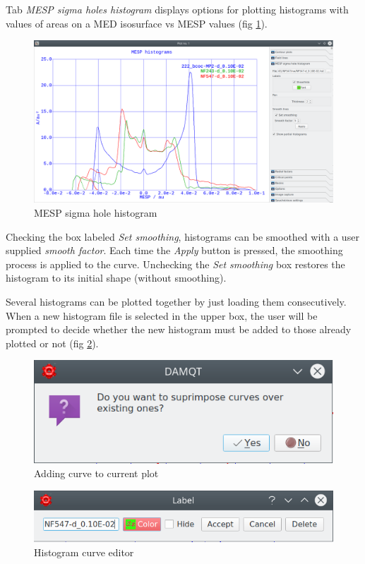 \documentclass[10pt]{article}
\begin{document}
Tab {\it MESP sigma holes histogram} displays options
for plotting histograms with values of areas on a MED isosurface vs MESP values (fig \ref{fig:3_3_1}). 

\begin{figure}[H]
\begin{center}
\includegraphics[width=0.5\linewidth]{damqt320_2D_histogram.png}
\end{center}
\caption{{MESP sigma hole histogram}\label{fig:3_3_1}}
\end{figure}

Checking the box labeled {\it Set smoothing}, histograms can be smoothed with a user supplied 
{\it smooth factor}. Each time the {\it Apply} button is pressed, the
smoothing process is applied to the curve. Unchecking the {\it Set smoothing} box
restores the histogram to its initial shape (without smoothing).

Several histograms can be plotted together by just loading them consecutively.
When a new histogram file is selected in the upper box, the user will be prompted
to decide whether the new histogram must be added to those already plotted or not (fig \ref{fig:3_3_2}).

\begin{minipage}{0.5\linewidth}

\begin{figure}[H]
\begin{center}
\includegraphics[width=0.5\linewidth]{damqt320_2D_histogram_query.png}
\end{center}
\caption{{Adding curve to current plot}\label{fig:3_3_2}}
\end{figure}

\end{minipage}
\begin{minipage}{0.5\linewidth}

\begin{figure}[H]
\begin{center}
\includegraphics[width=\linewidth]{damqt320_2D_histogram_editor.png}
\end{center}
\caption{{Histogram curve editor}\label{fig:3_3_3}}
\end{figure}

\end{minipage}
\end{document}
